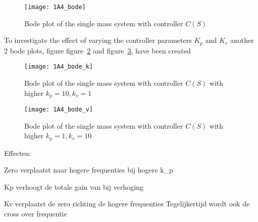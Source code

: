 \documentclass[report.tex]{subfiles}
\begin{document}
\begin{figure}[h!]
  \centering
    \texttt{[image: 1A4\_bode]}
 	\caption{Bode plot of the single mass system with controller $C(S)$}
  \label{fig:1A4_bode}
\end{figure}
To investigate the effect of varying the controller parameters $K_p$ and $K_v$ another 2 bode plots, figure figure~\ref{fig:1A4_bode_k} and figure~\ref{fig:1A4_bode_v}, have been created
\begin{figure}[h!]
  \centering
\texttt{[image: 1A4\_bode\_k]}
\caption{Bode plot of the single mass system with controller $C(S)$ with higher $k_p = 10, k_v
 = 1$}
\label{fig:1A4_bode_k}
\end{figure}

\begin{figure}[h!]
  \centering
\texttt{[image: 1A4\_bode\_v]}
\caption{Bode plot of the single mass system with controller $C(S)$ with higher $k_p = 1, k_v = 10$}
\label{fig:1A4_bode_v}
\end{figure}

Effecten:

Zero verplaatst naar hogere frequenties bij hogere k_p

Kp verhoogt de totale gain van bij verhoging

Kv verplaatst de zero richting de hogere frequenties
Tegelijkertijd wordt ook de cross over frequentie 
\end{document}
